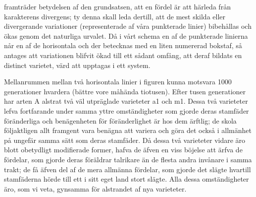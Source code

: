 framträder betydelsen af den grundsatsen, att en fördel är att härleda från karakterens divergens; ty denna skall leda dertill, att de mest skilda eller divergerande variationer (representerade af våra punkterade linier) bibehållas och ökas genom det naturliga urvalet. Då i vårt schema en af de punkterade linierna når en af de horisontala och der betecknas med en liten numererad bokstaf, så antages att variationen blifvit ökad till ett sådant omfång, att deraf bildats en distinct varietet, värd att upptagas i ett system.

Mellanrummen mellan två horisontala linier i figuren kunna motsvara 1000 generationer hvardera (bättre vore måhända tiotusen). Efter tusen generationer har arten A alstrat två väl utpräglade varieteter a1 och m1. Dessa två varieteter lefva fortfarande under samma yttre omständigheter som gjorde deras stamfäder föränderliga och benägenheten för föränderlighet är hos dem ärftlig; de skola följaktligen allt framgent vara benägna att variera och göra det också i allmänhet på ungefär samma sätt som deras stamfäder. Då dessa två varieteter vidare äro blott obetydligt modifierade former, hafva de äfven en viss böjelse att ärfva de fördelar, som gjorde deras föräldrar talrikare än de flesta andra invånare i samma trakt; de få äfven del af de mera allmänna fördelar, som gjorde det slägte hvartill stamfäderna hörde till ett i sitt eget land stort slägte. Alla dessa omständigheter äro, som vi veta, gynsamma för alstrandet af nya varieteter.

